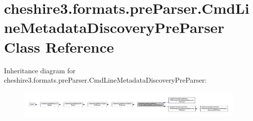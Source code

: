 \hypertarget{classcheshire3_1_1formats_1_1pre_parser_1_1_cmd_line_metadata_discovery_pre_parser}{\section{cheshire3.\-formats.\-pre\-Parser.\-Cmd\-Line\-Metadata\-Discovery\-Pre\-Parser Class Reference}
\label{classcheshire3_1_1formats_1_1pre_parser_1_1_cmd_line_metadata_discovery_pre_parser}
}


Inheritance diagram for cheshire3.\-formats.\-pre\-Parser.\-Cmd\-Line\-Metadata\-Discovery\-Pre\-Parser\-:
\nopagebreak
\begin{figure}[H]
\begin{center}
\leavevmode
\includegraphics[width=350pt]{classcheshire3_1_1formats_1_1pre_parser_1_1_cmd_line_metadata_discovery_pre_parser__inherit__graph}
\end{center}
\end{figure}


